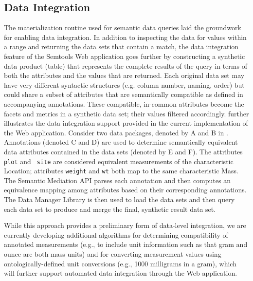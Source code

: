\subsection{Data Integration} 

The materialization routine used for semantic data queries laid the
groundwork for enabling data integration. In addition to inspecting
the data for values within a range and returning the data sets that
contain a match, the data integration feature of the Semtools Web
application goes further by constructing a synthetic data product
(table) that represents the complete results of the query in terms of
both the attributes and the values that are returned. Each original
data set may have very different syntactic structures (e.g. column
number, naming, order) but could share a subset of attributes that are
semantically compatible as defined in accompanying annotations. These
compatible, in-common attributes become the facets and metrics in a
synthetic data set; their values filtered
accordingly.  further illustrates the data
integration support provided in the current implementation of the Web
application. Consider two data packages, denoted by A and B in
.  Annotations (denoted C and D) are used to
determine semantically equivalent data attributes contained in the
data sets (denoted by E and F). The attributes {\tt plot} and {\tt
  site} are considered equivalent measurements of the characteristic
Location; attributes {\tt weight} and {\tt wt} both map to the same
characteristic Mass. The Semantic Mediation API parses each annotation
and then computes an equivalence mapping among attributes based on
their corresponding annotations. The Data Manager Library is then used
to load the data sets and then query each data set to produce and
merge the final, synthetic result data set.

While this approach provides a preliminary form of data-level
integration, we are currently developing additional algorithms for
determining compatibility of annotated measurements (e.g., to include
unit information such as that gram and ounce are both mass units) and
for converting measurement values using ontologically-defined unit
conversions (e.g., 1000 milligrams in a gram), which will further
support automated data integration through the Web application.


